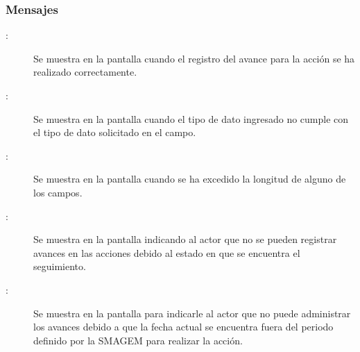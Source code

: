 \subsubsection{Mensajes}

    \begin{description}
    
        \item [:] Se muestra en la pantalla  cuando el registro del avance para la acción se ha realizado correctamente.
        
        \item [:] Se muestra en la pantalla  cuando el tipo de dato ingresado no cumple con el tipo de dato solicitado en el campo.
        
        \item [:] Se muestra en la pantalla  cuando se ha excedido la longitud de alguno de los campos.  
        
        \item [:] Se muestra en la pantalla  indicando al actor que no se pueden registrar avances en las acciones debido al estado en que se encuentra el seguimiento.

        \item [:] Se muestra en la pantalla  para indicarle al actor que no puede administrar los avances debido a que la fecha actual se encuentra fuera del periodo definido por la SMAGEM para realizar la acción.
    \end{description}

